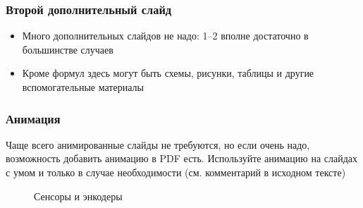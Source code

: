 \documentclass{beamer}
\begin{document}
\begin{frame}
  \frametitle{Второй дополнительный слайд}
\begin{itemize}
  \item Много дополнительных слайдов не надо: 1--2 вполне достаточно в большинстве случаев
  \item Кроме формул здесь могут быть схемы, рисунки, таблицы и другие вспомогательные материалы
\end{itemize}

\end{frame}

\begin{frame}
  \frametitle{Анимация}
  Чаще всего анимированные слайды не требуются, но если очень надо, возможность добавить анимацию в PDF есть.
  Используйте анимацию на слайдах с умом и только в случае необходимости (см. комментарий в исходном тексте)

  \setlength{\fboxsep}{0pt}
  \setlength{\fboxrule}{0.5pt}
  \begin{figure}[h]
    \begin{minipage}{0.45\textwidth}
        \centering
    \end{minipage}
    \begin{minipage}{0.45\textwidth}
        \centering
    \end{minipage}
    \caption{Сенсоры и энкодеры}
  \end{figure}
\end{frame}
\end{document}
